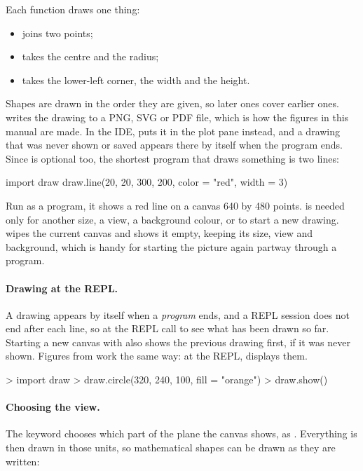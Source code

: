 \documentclass[11pt,a4paper,openany]{report}
\begin{document}
{{Each function draws one thing:

\begin{itemize}
\item {} joins two points;
\item {} takes the centre and the radius;
\item {} takes the lower-left corner, the width
  and the height.
\end{itemize}

Shapes are drawn in the order they are given, so later ones cover earlier
ones.
 writes the drawing to a PNG, SVG or PDF file, which is how
the figures in this manual are made. In the IDE,  puts it in
the plot pane instead, and a drawing that was never shown or saved appears
there by itself when the program ends. Since  is optional
too, the shortest program that draws something is two lines:

\begin{axon}
import draw
draw.line(20, 20, 300, 200, color = "red", width = 3)
\end{axon}

Run as a program, it shows a red line on a canvas 640 by 480 points.
 is needed only for another size, a view, a background
colour, or to start a new drawing.  wipes the current
canvas and shows it empty, keeping its size, view and background, which is
handy for starting the picture again partway through a program.

\paragraph{Drawing at the REPL.} A drawing appears by itself when a
\emph{program} ends, and a REPL session does not end after each line, so at
the REPL call  to see what has been drawn so far. Starting a
new canvas with  also shows the previous drawing first, if
it was never shown. Figures from  work the same way: at the REPL,
 displays them.

\begin{axonrepl}
> import draw
> draw.circle(320, 240, 100, fill = "orange")
> draw.show()
\end{axonrepl}

\paragraph{Choosing the view.} The  keyword chooses which part of
the plane the canvas shows, as . Everything is
then drawn in those units, so mathematical shapes can be drawn as they are
written:

}}
\end{document}
